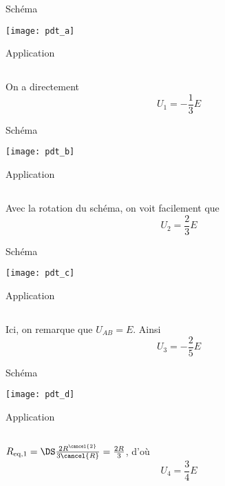 \documentclass[a4paper, 12pt, final, garamond]{book}
\begin{document}
\begin{tcbraster}[raster columns=4, raster equal height=rows]
    \begin{NCdefi}[]{Schéma}
        \begin{center}
            \hspace*{-13pt}\texttt{[image: pdt\_a]}
        \end{center}
    \end{NCdefi}
    \begin{NCexem}[]{Application}
        \subsection{}
        On a directement
        \[ \boxed{U_1 = - \frac{1}{3}E}\]
    \end{NCexem}
    \begin{NCdefi}[]{Schéma}
        \begin{center}
            \texttt{[image: pdt\_b]}
        \end{center}
    \end{NCdefi}
    \begin{NCexem}[]{Application}
        \subsection{}
        Avec la rotation du schéma, on voit facilement que
        \[ \boxed{U_2 = \frac{2}{3}E}\]
    \end{NCexem}
    \begin{NCdefi}[]{Schéma}
        \begin{center}
            \hspace*{-15pt}\texttt{[image: pdt\_c]}
        \end{center}
    \end{NCdefi}
    \begin{NCexem}[]{Application}
        \subsection{}
        Ici, on remarque que $U_{AB} = E$. Ainsi
        \[ \boxed{U_3 = - \frac{2}{5}E}\]
    \end{NCexem}
    \begin{NCdefi}[]{Schéma}
        \begin{center}
            \texttt{[image: pdt\_d]}
        \end{center}
    \end{NCdefi}
    \begin{NCexem}[]{Application}
        \subsection{}
        $R_{\rm eq,1} =\DS \frac{2R^{\cancel{2}}}{3\cancel{R}} = \frac{2R}{3}$, d'où
        \[ \boxed{U_4 = \frac{3}{4}E}\]
    \end{NCexem}
\end{tcbraster}
\end{document}
